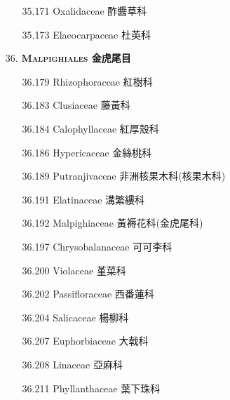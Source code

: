 \begin{enumerate}
\begin{enumerate}
      \item[35.171] Oxalidaceae 酢醬草科     
        
      \item[35.173] Elaeocarpaceae 杜英科     
        
    \end{enumerate}
  \item[36. ] \textbf{\textsc{Malpighiales} 金虎尾目}   
    \begin{enumerate}
      \item[36.179] Rhizophoraceae 紅樹科     
        
      \item[36.183] Clusiaceae 藤黃科     
        
      \item[36.184] Calophyllaceae 紅厚殼科     
        
      \item[36.186] Hypericaceae 金絲桃科     
        
      \item[36.189] Putranjivaceae 非洲核果木科(核果木科)     
        
      \item[36.191] Elatinaceae 溝繁縷科     
        
      \item[36.192] Malpighiaceae 黃褥花科(金虎尾科)     
        
      \item[36.197] Chrysobalanaceae 可可李科     
        
      \item[36.200] Violaceae 堇菜科     
        
      \item[36.202] Passifloraceae 西番蓮科     
        
      \item[36.204] Salicaceae 楊柳科     
        
      \item[36.207] Euphorbiaceae 大戟科     
        
      \item[36.208] Linaceae 亞麻科     
        
      \item[36.211] Phyllanthaceae 葉下珠科     
        
    \end{enumerate}
\end{enumerate}

